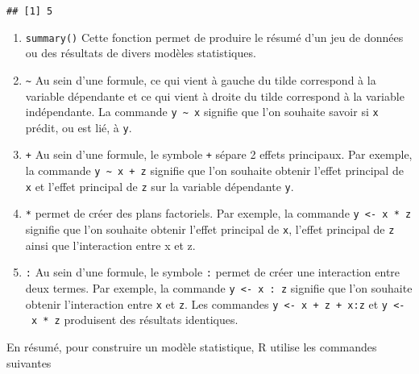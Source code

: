 \documentclass[
]{book}
\begin{document}
\begin{verbatim}
## [1] 5
\end{verbatim}

\begin{enumerate}
\def\labelenumi{\arabic{enumi}.}
\setcounter{enumi}{1}
\item
  \texttt{summary()} Cette fonction permet de produire le résumé d'un jeu de données ou des résultats de divers modèles statistiques.
\item
  \texttt{\textasciitilde{}} Au sein d'une formule, ce qui vient à gauche du tilde correspond à la variable dépendante et ce qui vient à droite du tilde correspond à la variable indépendante. La commande \texttt{y\ \textasciitilde{}\ x} signifie que l'on souhaite savoir si \texttt{x} prédit, ou est lié, à \texttt{y}. 
\item
  \texttt{+} Au sein d'une formule, le symbole \texttt{+} sépare 2 effets principaux. Par exemple, la commande \texttt{y\ \textasciitilde{}\ x\ +\ z} signifie que l'on souhaite obtenir l'effet principal de \texttt{x} et l'effet principal de \texttt{z} sur la variable dépendante \texttt{y}.
\item
  \texttt{*} permet de créer des plans factoriels. Par exemple, la commande \texttt{y\ \textless{}-\ x\ *\ z} signifie que l'on souhaite obtenir l'effet principal de \texttt{x}, l'effet principal de \texttt{z} ainsi que l'interaction entre x et z.
\item
  \texttt{:} Au sein d'une formule, le symbole \texttt{:} permet de créer une interaction entre deux termes. Par exemple, la commande \texttt{y\ \textless{}-\ x\ :\ z} signifie que l'on souhaite obtenir l'interaction entre \texttt{x} et \texttt{z}. Les commandes \texttt{y\ \textless{}-\ x\ +\ z\ +\ x:z} et \texttt{y\ \textless{}-\ x\ *\ z} produisent des résultats identiques. 
\end{enumerate}

En résumé, pour construire un modèle statistique, R utilise les commandes suivantes
\end{document}
